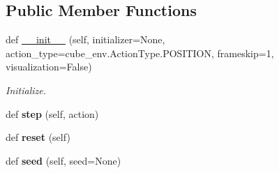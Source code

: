 \subsection*{Public Member Functions}
\begin{DoxyCompactItemize}
\item 
def \hyperlink{classexample__pushing__training__env_1_1ExamplePushingTrainingEnv_a1b542291e45e2b2c267b8a240193e0b4}{\+\_\+\+\_\+init\+\_\+\+\_\+} (self, initializer=None, action\+\_\+type=cube\+\_\+env.\+Action\+Type.\+P\+O\+S\+I\+T\+I\+ON, frameskip=1, visualization=False)
\begin{DoxyCompactList}\small\item\em Initialize. \end{DoxyCompactList}\item 
\mbox{\label{classexample__pushing__training__env_1_1ExamplePushingTrainingEnv_a92e5f26d7d80d93b686c97dce911874d}} 
def {\bfseries step} (self, action)
\item 
\mbox{\label{classexample__pushing__training__env_1_1ExamplePushingTrainingEnv_a592d95e4040bb362f438849df5fa6fc8}} 
def {\bfseries reset} (self)
\item 
\mbox{\label{classexample__pushing__training__env_1_1ExamplePushingTrainingEnv_a6873cea9e63b86cc3565c1cd914747be}} 
def {\bfseries seed} (self, seed=None)
\end{DoxyCompactItemize}
